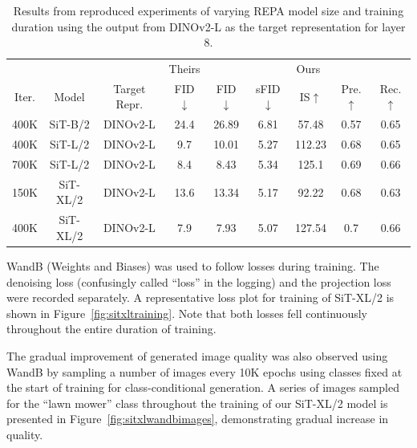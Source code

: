 \documentclass{article}
\begin{document}
\begin{table}[t]
    \centering
    \begin{tabular}{c c c | c | c c c c c}
    \toprule & & & Theirs & \multicolumn{5}{c}{Ours} \\
    Iter. & Model & Target Repr. & FID$\downarrow$ & FID$\downarrow$ & sFID$\downarrow$ & IS$\uparrow$ & Pre.$\uparrow$ & Rec.$\uparrow$ \\ \midrule
    400K & SiT-B/2 & DINOv2-L & 24.4 & 26.89 & 6.81 & 57.48 & 0.57 & 0.65 \\
    400K & SiT-L/2 & DINOv2-L & 9.7 & 10.01 & 5.27 & 112.23 & 0.68 & 0.65 \\
    700K & SiT-L/2 & DINOv2-L & 8.4 & 8.43 & 5.34 & 125.1 & 0.69 & 0.66 \\
    150K & SiT-XL/2 & DINOv2-L & 13.6 & 13.34 & 5.17 & 92.22 & 0.68 & 0.63 \\
    400K & SiT-XL/2 & DINOv2-L & 7.9 & 7.93 & 5.07 & 127.54 & 0.7 & 0.66 \\ \bottomrule \end{tabular}
    \caption{Results from reproduced experiments of varying REPA model size and training duration using the output from DINOv2-L as the target representation for layer 8.}
    \label{tab:tab-repa-size-epoch}
\end{table}

WandB (Weights and Biases) was used to follow losses during training. The denoising loss (confusingly called ``loss'' in the logging) and the projection loss were recorded separately. A representative loss plot for training of SiT-XL/2 is shown in Figure~\ref{fig:sitxltraining}. Note that both losses fell continuously throughout the entire duration of training.

The gradual improvement of generated image quality was also observed using WandB by sampling a number of images every 10K epochs using classes fixed at the start of training for class-conditional generation. A series of images sampled for the ``lawn mower'' class throughout the training of our SiT-XL/2 model is presented in Figure~\ref{fig:sitxlwandbimages}, demonstrating gradual increase in quality.
\end{document}
